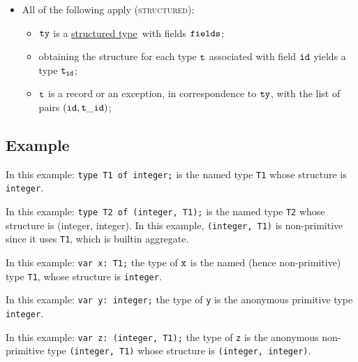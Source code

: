 \documentclass{book}
\newcommand\ProseOrTypeError[0]{\ProseTerminateAs{\TypeErrorConfig}}
\newcommand\structuredtype[0]{\hyperlink{def-structuredtype}{structured type}}
\begin{document}
\begin{itemize}
\begin{itemize}
  \end{itemize}
\item All of the following apply (\textsc{structured}):
  \begin{itemize}
  \item $\texttt{ty}$ is a \structuredtype\ with fields $\texttt{fields}$;
  \item obtaining the structure for each type $\texttt{t}$ associated with field $\texttt{id}$ yields a type $\texttt{t}_{\texttt{id}}$\ProseOrTypeError;
  \item $\texttt{t}$ is a record or an exception, in correspondence to $\texttt{ty}$, with the list of pairs $(\texttt{id}, \texttt{t}\_\texttt{id})$;
  \end{itemize}
\end{itemize}

\subsection{Example}
In this example:
\texttt{type T1 of integer;} is the named type \texttt{T1}
whose structure is \texttt{integer}.

In this example:
\texttt{type T2 of (integer, T1);}
is the named type \texttt{T2} whose structure is (integer, integer). In this
example, \texttt{(integer, T1)} is non-primitive since it uses \texttt{T1}, which is builtin aggregate.

In this example:
\texttt{var x: T1;}
the type of $\texttt{x}$ is the named (hence non-primitive) type \texttt{T1}, whose structure
is \texttt{integer}.

In this example:
\texttt{var y: integer;}
the type of \texttt{y} is the anonymous primitive type \texttt{integer}.

In this example:
\texttt{var z: (integer, T1);}
the type of \texttt{z} is the anonymous non-primitive type
\texttt{(integer, T1)} whose structure is \texttt{(integer, integer)}.

\end{document}
